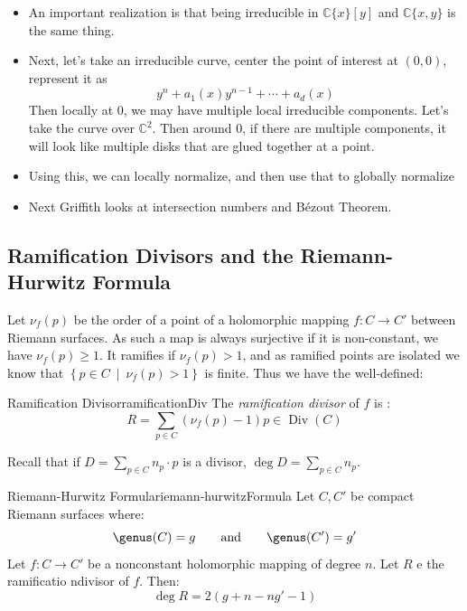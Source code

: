 \documentclass{book}
\newcommand{\C}{{\mathbb{C}}}
\newcommand{\Div}{{\operatorname{Div}}}
\newcommand{\set}[2]{\left\{#1 \ \middle|\ #2\right\}}
\begin{document}
\begin{itemize}
        \begin{Proof}
          Note that proving $\C\{x\}$ is a UFD is easy because any $f(x) = x^mh(x)$ with $h(x)$ a unit with
          nonzero constant. For the rest checkout \cite{a.griffithsIntroductionAlgebraicCurves}.
        \end{Proof}
      \item An important realization is that being irreducible in $\C\{x\}[y]$ and $\C\{x,y\}$ is the same
        thing.
        \item Next, let's take an irreducible curve, center the point of interest at $(0,0)$, represent it as
          \[
            y^n + a_1(x)y^{n-1} + \cdots + a_d(x)
          \]
          Then locally at $0$, we may have multiple local irreducible components. Let's take the curve over
          $\C^2$. Then around $0$, if there are multiple components, it will look like multiple disks that are
          glued together at a point.
          \item Using this, we can locally normalize, and then use that to globally normalize
         \item Next Griffith looks at intersection numbers and B\'ezout Theorem.
\end{itemize}

\subsection*{Ramification Divisors and the Riemann-Hurwitz Formula}

Let $\nu_f(p)$ be the order of a point of a holomorphic mapping $f: C \to C'$ between Riemann surfaces. As
such a map is always surjective if it is non-constant, we have $\nu_f(p) \ge 1$. It ramifies if $\nu_f(p)
> 1$, and as ramified points are isolated we know that $\set{p \in C}{\nu_f(p) > 1}$ is finite. Thus we have
the well-defined:
\begin{defn}{Ramification Divisor}{ramificationDiv}
  The \emph{ramification divisor} of $f$ is :
  \[
    R = \sum_{p \in C} (\nu_f(p)-1)p \in\Div(C)
  \]
\end{defn}

Recall that if $D = \sum_{p \in C} n_p\cdot p$ is a divisor, $\deg D = \sum_{p \in C} n_p$.

\begin{thm}{Riemann-Hurwitz Formula}{riemann-hurwitzFormula}
  Let $C,C'$ be compact Riemann surfaces where:
  \[
    \genus(C) = g \qquad \text{and} \qquad \genus(C') = g'
  \]
  Let $f: C \to C'$ be a nonconstant holomorphic mapping of degree $n$. Let $R$ e the ramificatio ndivisor of
  $f$. Then:
  \[
    \deg R = 2(g+n-ng'-1)
  \]
\end{thm}
\end{document}
